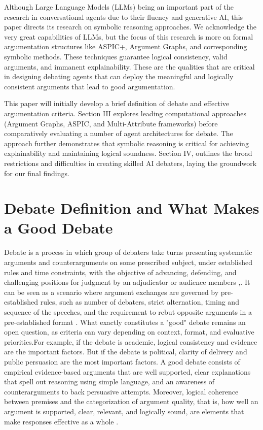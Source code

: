 \documentclass[conference]{IEEEtran}
\begin{document}
Although Large Language Models (LLMs) being an important part of the research in conversational agents due to their fluency and generative AI, this paper directs its research on symbolic reasoning approaches. We acknowledge the very great capabilities of LLMs, but the focus of this research is more on formal argumentation structures like ASPIC+, Argument Graphs, and corresponding symbolic methods. These techniques guarantee logical consistency, valid arguments, and immanent explainability. These are the qualities that are critical in designing debating agents that can deploy the meaningful and logically consistent arguments that lead to good argumentation.

This paper will initially develop a brief definition of debate and effective argumentation criteria. Section III explores leading computational approaches (Argument Graphs, ASPIC, and Multi-Attribute frameworks) before comparatively evaluating a number of agent architectures for debate. The approach further demonstrates that symbolic reasoning is critical for achieving explainability and maintaining logical soundness. Section IV, outlines the broad restrictions and difficulties in creating skilled AI debaters, laying the groundwork for our final findings.



\section{Debate Definition and What Makes a Good Debate}
Debate is a process in which group of debaters take turns presenting systematic arguments and counterarguments on some prescribed subject, under established rules and time constraints, with the objective of advancing, defending, and challenging positions for judgment by an adjudicator or audience members \cite{rakshit2019debbie},\cite{tan2016winning}. It can be seen as a scenario where argument exchanges are governed by pre-established rules, such as number of debaters, strict alternation, timing and sequence of the speeches, and the requirement to rebut opposite arguments in a pre-established format \cite{engelmann2022argumentation}. What exactly constitutes a "good" debate remains an open question, as criteria can vary depending on context, format, and evaluative priorities.For example, if the debate is academic, logical consistency and evidence are the important factors. But if the debate is political, clarity of delivery and public persuasion are the most important factors. A good debate consists of empirical evidence-based arguments that are well supported, clear explanations that spell out reasoning using simple language, and an awareness of counterarguments to back persuasive attempts. Moreover, logical coherence between premises and the categorization of argument quality, that is, how well an argument is supported, clear, relevant, and logically sound, are elements that make responses effective as a whole \cite{engelmann2022argumentation}.
\end{document}
